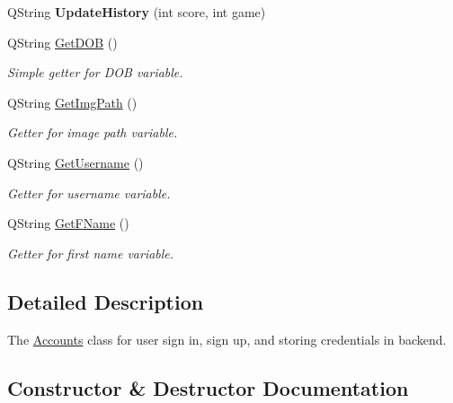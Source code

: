 \begin{DoxyCompactItemize}
\mbox{\label{classAccounts_a8a2edd82ca79c9c05341296e86c2a972}} 
Q\+String {\bfseries Update\+History} (int score, int game)
\item 
Q\+String \hyperlink{classAccounts_add43226d678648809eae2c7b11d3692b}{Get\+D\+OB} ()
\begin{DoxyCompactList}\small\item\em Simple getter for D\+OB variable. \end{DoxyCompactList}\item 
Q\+String \hyperlink{classAccounts_ad9cac5e9a586f525939b120070cbdc2d}{Get\+Img\+Path} ()
\begin{DoxyCompactList}\small\item\em Getter for image path variable. \end{DoxyCompactList}\item 
Q\+String \hyperlink{classAccounts_aa5d96a34d4281ce65a473b761ad9515a}{Get\+Username} ()
\begin{DoxyCompactList}\small\item\em Getter for username variable. \end{DoxyCompactList}\item 
Q\+String \hyperlink{classAccounts_a264f663ad2a101cdbfbf12d083ee86b5}{Get\+F\+Name} ()
\begin{DoxyCompactList}\small\item\em Getter for first name variable. \end{DoxyCompactList}\end{DoxyCompactItemize}


\subsection{Detailed Description}
The \hyperlink{classAccounts}{Accounts} class for user sign in, sign up, and storing credentials in backend. 

\subsection{Constructor \& Destructor Documentation}
\mbox{\label{classAccounts_ad1526db68d755eeac36773b25ce2fb5c}} 
